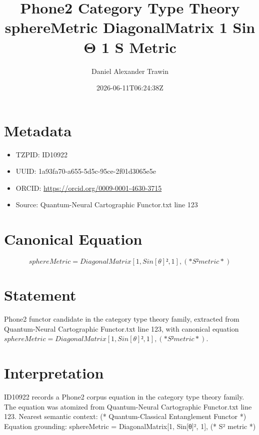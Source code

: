 \documentclass[11pt]{article}
\title{Phone2 Category Type Theory sphereMetric DiagonalMatrix 1 Sin Θ 1 S Metric}
\author{Daniel Alexander Trawin}
\date{2026-06-11T06:24:38Z}
\begin{document}
\maketitle
\section*{Metadata}
\begin{itemize}
\item TZPID: ID10922
\item UUID: 1a93fa70-a655-5d5c-95ce-2f01d3065e5e
\item ORCID: \url{https://orcid.org/0009-0001-4630-3715}
\item Source: Quantum-Neural Cartographic Functor.txt line 123
\end{itemize}
\section*{Canonical Equation}
\[
sphereMetric = DiagonalMatrix[{1, Sin[θ]², 1}], (* S² metric *)
\]
\section*{Statement}
Phone2 functor candidate in the category type theory family, extracted from Quantum-Neural Cartographic Functor.txt line 123, with canonical equation $sphereMetric = DiagonalMatrix[{1, Sin[θ]², 1}], (* S² metric *)$.
\section*{Interpretation}
ID10922 records a Phone2 corpus equation in the category type theory family. The equation was atomized from Quantum-Neural Cartographic Functor.txt line 123. Nearest semantic context: (* Quantum-Classical Entanglement Functor *) Equation grounding: sphereMetric = DiagonalMatrix[{1, Sin[θ]², 1}], (* S² metric *)
\end{document}
